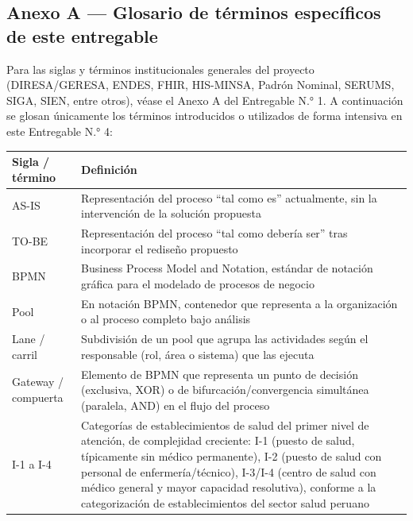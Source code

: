 \documentclass[11pt,a4paper]{article}
\begin{document}
\subsection{Anexo A --- Glosario de términos específicos de este entregable}\label{anexo-a-glosario-de-tuxe9rminos-especuxedficos-de-este-entregable}

Para las siglas y términos institucionales generales del proyecto (DIRESA/GERESA, ENDES, FHIR, HIS-MINSA, Padrón Nominal, SERUMS, SIGA, SIEN, entre otros), véase el Anexo A del Entregable N.° 1. A continuación se glosan únicamente los términos introducidos o utilizados de forma intensiva en este Entregable N.° 4:

{\small
\begin{longtable}[]{@{}
  >{\raggedright\arraybackslash}p{}
  >{\raggedright\arraybackslash}p{}@{}}
\toprule\noalign{}
\begin{minipage}[b]{\linewidth}\raggedright
Sigla / término
\end{minipage} & \begin{minipage}[b]{\linewidth}\raggedright
Definición
\end{minipage} \\
\midrule\noalign{}
\endhead
\bottomrule\noalign{}
\endlastfoot
AS-IS & Representación del proceso ``tal como es'' actualmente, sin la intervención de la solución propuesta \\
TO-BE & Representación del proceso ``tal como debería ser'' tras incorporar el rediseño propuesto \\
BPMN & Business Process Model and Notation, estándar de notación gráfica para el modelado de procesos de negocio \\
Pool & En notación BPMN, contenedor que representa a la organización o al proceso completo bajo análisis \\
Lane / carril & Subdivisión de un pool que agrupa las actividades según el responsable (rol, área o sistema) que las ejecuta \\
Gateway / compuerta & Elemento de BPMN que representa un punto de decisión (exclusiva, XOR) o de bifurcación/convergencia simultánea (paralela, AND) en el flujo del proceso \\
I-1 a I-4 & Categorías de establecimientos de salud del primer nivel de atención, de complejidad creciente: I-1 (puesto de salud, típicamente sin médico permanente), I-2 (puesto de salud con personal de enfermería/técnico), I-3/I-4 (centro de salud con médico general y mayor capacidad resolutiva), conforme a la categorización de establecimientos del sector salud peruano \\

\end{longtable}}
\end{document}
